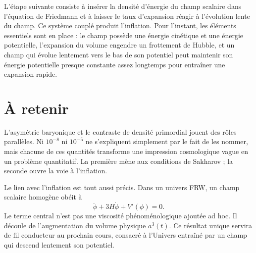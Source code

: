L’étape suivante consiste à insérer la densité d’énergie du champ scalaire dans l’équation de Friedmann et à laisser le taux d’expansion réagir à l’évolution lente du champ. Ce système couplé produit l’inflation. Pour l’instant, les éléments essentiels sont en place : le champ possède une énergie cinétique et une énergie potentielle, l’expansion du volume engendre un frottement de Hubble, et un champ qui évolue lentement vers le bas de son potentiel peut maintenir son énergie potentielle presque constante assez longtemps pour entraîner une expansion rapide.

\section{À retenir}

L’asymétrie baryonique et le contraste de densité primordial jouent des rôles parallèles. Ni \(10^{-8}\) ni \(10^{-5}\) ne s’expliquent simplement par le fait de les nommer, mais chacune de ces quantités transforme une impression cosmologique vague en un problème quantitatif. La première mène aux conditions de Sakharov ; la seconde ouvre la voie à l’inflation.

Le lien avec l’inflation est tout aussi précis. Dans un univers FRW, un champ scalaire homogène obéit à
\[
\ddot\phi+3H\dot\phi+V'(\phi)=0.
\]Le terme central n’est pas une viscosité phénoménologique ajoutée ad hoc. Il découle de l’augmentation du volume physique \(a^3(t)\). Ce résultat unique servira de fil conducteur au prochain cours, consacré à l’Univers entraîné par un champ qui descend lentement son potentiel.